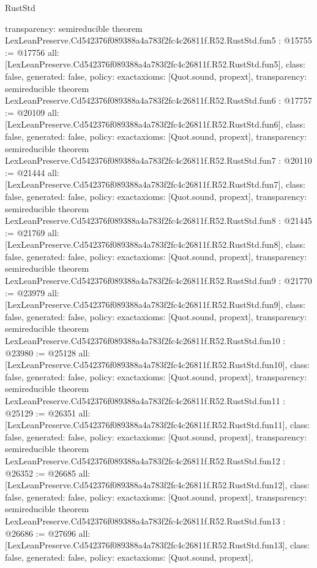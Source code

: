 \begin{lexlean}{RustStd}
\begin{coremodule}
{  transparency: semireducible
}
theorem LexLeanPreserve.Cd542376f089388a4a783f2fc4c26811f.R52.RustStd.fun5 : @15755 := @17756 {
  all: [LexLeanPreserve.Cd542376f089388a4a783f2fc4c26811f.R52.RustStd.fun5],
  class: false,
  generated: false,
  policy: exact{axioms: [Quot.sound, propext]},
  transparency: semireducible
}
theorem LexLeanPreserve.Cd542376f089388a4a783f2fc4c26811f.R52.RustStd.fun6 : @17757 := @20109 {
  all: [LexLeanPreserve.Cd542376f089388a4a783f2fc4c26811f.R52.RustStd.fun6],
  class: false,
  generated: false,
  policy: exact{axioms: [Quot.sound, propext]},
  transparency: semireducible
}
theorem LexLeanPreserve.Cd542376f089388a4a783f2fc4c26811f.R52.RustStd.fun7 : @20110 := @21444 {
  all: [LexLeanPreserve.Cd542376f089388a4a783f2fc4c26811f.R52.RustStd.fun7],
  class: false,
  generated: false,
  policy: exact{axioms: [Quot.sound, propext]},
  transparency: semireducible
}
theorem LexLeanPreserve.Cd542376f089388a4a783f2fc4c26811f.R52.RustStd.fun8 : @21445 := @21769 {
  all: [LexLeanPreserve.Cd542376f089388a4a783f2fc4c26811f.R52.RustStd.fun8],
  class: false,
  generated: false,
  policy: exact{axioms: [Quot.sound, propext]},
  transparency: semireducible
}
theorem LexLeanPreserve.Cd542376f089388a4a783f2fc4c26811f.R52.RustStd.fun9 : @21770 := @23979 {
  all: [LexLeanPreserve.Cd542376f089388a4a783f2fc4c26811f.R52.RustStd.fun9],
  class: false,
  generated: false,
  policy: exact{axioms: [Quot.sound, propext]},
  transparency: semireducible
}
theorem LexLeanPreserve.Cd542376f089388a4a783f2fc4c26811f.R52.RustStd.fun10 : @23980 := @25128 {
  all: [LexLeanPreserve.Cd542376f089388a4a783f2fc4c26811f.R52.RustStd.fun10],
  class: false,
  generated: false,
  policy: exact{axioms: [Quot.sound, propext]},
  transparency: semireducible
}
theorem LexLeanPreserve.Cd542376f089388a4a783f2fc4c26811f.R52.RustStd.fun11 : @25129 := @26351 {
  all: [LexLeanPreserve.Cd542376f089388a4a783f2fc4c26811f.R52.RustStd.fun11],
  class: false,
  generated: false,
  policy: exact{axioms: [Quot.sound, propext]},
  transparency: semireducible
}
theorem LexLeanPreserve.Cd542376f089388a4a783f2fc4c26811f.R52.RustStd.fun12 : @26352 := @26685 {
  all: [LexLeanPreserve.Cd542376f089388a4a783f2fc4c26811f.R52.RustStd.fun12],
  class: false,
  generated: false,
  policy: exact{axioms: [Quot.sound, propext]},
  transparency: semireducible
}
theorem LexLeanPreserve.Cd542376f089388a4a783f2fc4c26811f.R52.RustStd.fun13 : @26686 := @27696 {
  all: [LexLeanPreserve.Cd542376f089388a4a783f2fc4c26811f.R52.RustStd.fun13],
  class: false,
  generated: false,
  policy: exact{axioms: [Quot.sound, propext]},
}
\end{coremodule}
\end{lexlean}
